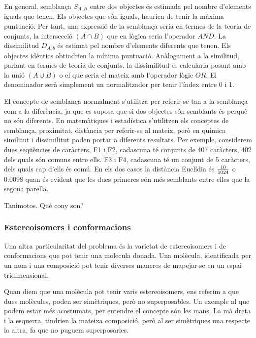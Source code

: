 \documentclass[titlepage,a4paper,12pt]{book}
\begin{document}
En general, semblança $S_{A,B}$ entre dos objectes és estimada pel nombre d'elements iguals que tenen. Els objectes que són iguals, haurien de tenir la màxima puntuació. Per tant, una expressió de la semblança seria en termes de la teoria de conjunts, la intersecció $(A\cap B)$ que en lògica seria l'operador $AND$. La dissimilitud $D_{A,b}$ és estimat pel nombre d'elements diferents que tenen. Els objectes idèntics obtindrien la mínima puntuació. Anàlogament a la similitud, parlant en termes de teoria de conjunts, la dissimilitud es calcularia posant amb la unió $(A\cup B)$ o el que seria el mateix amb l'operador lògic $OR$. El denominador serà simplement un normalitzador per tenir l'índex entre 0 i 1. 

El concepte de semblança normalment s'utilitza per referir-se tan a la semblança com a la diferència, ja que es suposa que si dos objectes són semblants és perquè no són diferents. En matemàtiques i estadística s'utilitzen els conceptes de semblança, proximitat, distància per referir-se al mateix, però en química similitut i dissimilitut poden portar a diferents resultats. Per exemple, considerem dues seqüències de caràcters, F1 i F2, cadascuna té conjunts de 407 caràcters, 402 dels quals són comuns entre ells. F3 i F4, cadascuna té un conjunt de 5 caràcters, dels quals cap d'ells és comú. En els dos casos la distància Euclídia és $10 \over 1024$  o $0.0098$ quan és evident que les dues primeres són més semblants entre elles que la segona parella.

Tanimotos. Què cony son? %

\subsubsection{Estereoisomers i conformacions}\label{ssub:estereoisomers i conformacions}

Una altra particularitat del problema és la varietat de estereoisomers i de
conformacions que pot tenir una molecula donada.  Una molècula, identificada per
un nom i una composició pot tenir diverses maneres de mapejar-se en un espai
tridimensional.

Quan diem que una molècula pot tenir varis estereoisomers, ens referim a que
dues molècules, poden ser simètriques, però no superposables.  Un exemple al que
podem estar més acostumats, per entendre el concepte són les mans.  La mà dreta
i la esquerra, tindrien la mateixa composició, però al ser simètriques una
respecte la altra, fa que no puguem superposarles.
\end{document}
